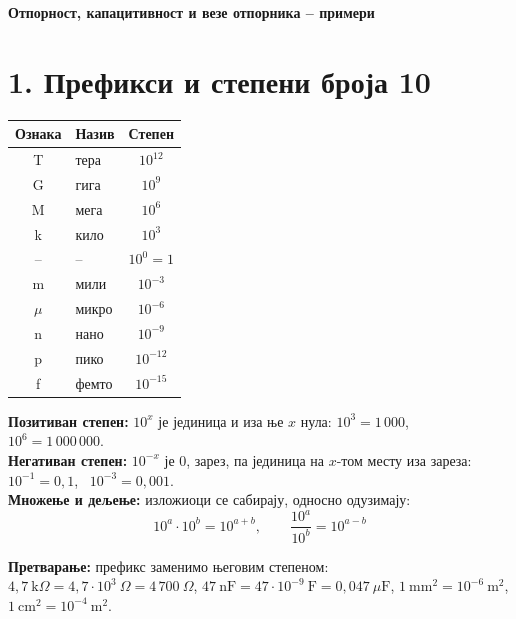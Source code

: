 \documentclass[10pt]{article}
\begin{document}
\begin{center}
    {\Large\bfseries Отпорност, капацитивност и везе отпорника -- примери}
\end{center}
\vspace{-6pt}

\section*{1. Префикси и степени броја 10}

\begin{minipage}[t]{0.36\linewidth}
\vspace{0pt}
\centering\small
\renewcommand{\arraystretch}{1.1}
\begin{tabular}{|c|l|c|}
    \hline
    \textbf{Ознака} & \textbf{Назив} & \textbf{Степен}  \\ \hline
    T     & тера  & $10^{12}$   \\ \hline
    G     & гига  & $10^{9}$    \\ \hline
    M     & мега  & $10^{6}$    \\ \hline
    k     & кило  & $10^{3}$   \\ \hline
    --    & --    & $10^{0} = 1$ \\ \hline
    m     & мили  & $10^{-3}$  \\ \hline
    $\mu$ & микро & $10^{-6}$   \\ \hline
    n     & нано  & $10^{-9}$   \\ \hline
    p     & пико  & $10^{-12}$  \\ \hline
    f     & фемто & $10^{-15}$ \\ \hline
\end{tabular}
\end{minipage}\hfill
\begin{minipage}[t]{0.62\linewidth}
\vspace{0pt}
\begin{kljucno}
\textbf{Позитиван степен:} $10^{x}$ је јединица и иза ње $x$ нула:
$10^{3} = 1\,000$, \ $10^{6} = 1\,000\,000$.\\
\textbf{Негативан степен:} $10^{-x}$ је $0$, зарез, па јединица на
$x$-том месту иза зареза: $10^{-1} = 0{,}1$, \ $10^{-3} = 0{,}001$.\\
\textbf{Множење и дељење:} изложиоци се сабирају, односно одузимају:
\[ 10^{a}\cdot 10^{b} = 10^{a+b}, \qquad \frac{10^{a}}{10^{b}} = 10^{a-b} \]
\vspace{-12pt}
\end{kljucno}

\textbf{Претварање:} префикс заменимо његовим степеном:
$4{,}7~\text{k}\Omega = 4{,}7\cdot 10^{3}~\Omega = 4\,700~\Omega$, \;
$47~\text{nF} = 47\cdot 10^{-9}~\text{F} = 0{,}047~\mu\text{F}$, \;
$1~\text{mm}^2 = 10^{-6}~\text{m}^2$, \; $1~\text{cm}^2 = 10^{-4}~\text{m}^2$.
\end{minipage}
\end{document}
